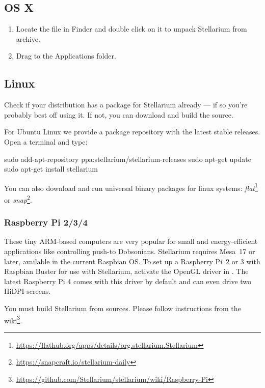 \subsection{OS X}
\label{sec:GettingStarted:Installation:OSX}

\begin{enumerate}
\item
  Locate the  file in
  Finder and double click on it to unpack Stellarium from archive.
\item
  Drag  to the Applications folder.
\end{enumerate}

\subsection{Linux}
\label{sec:GettingStarted:Installation:Linux}

Check if your distribution has a package for Stellarium already --- if
so you're probably best off using it. If not, you can download and build
the source.

For Ubuntu Linux we provide a package repository with the latest stable
releases. Open a terminal and type:

\begin{commands}
sudo add-apt-repository ppa:stellarium/stellarium-releases
sudo apt-get update
sudo apt-get install stellarium
\end{commands}

You can also download and run universal binary packages for linux systems:  \emph{flat}\footnote{\url{https://flathub.org/apps/details/org.stellarium.Stellarium}} or \emph{snap}\footnote{\url{https://snapcraft.io/stellarium-daily}}.

\subsubsection{Raspberry Pi 2/3/4}
These tiny ARM-based computers are very popular for small and energy-efficient applications like controlling push-to Dobsonians. 
Stellarium requires Mesa~17 or later, available in the current Raspbian OS. 
To set up a Raspberry Pi~2 or 3 with Raspbian Buster for use with Stellarium, activate the OpenGL driver in 
. The latest Raspberry Pi 4 comes with this driver by default and can even drive two HiDPI screens.

You must build Stellarium from sources. Please follow instructions from the wiki\footnote{\url{https://github.com/Stellarium/stellarium/wiki/Raspberry-Pi}}.

